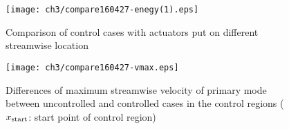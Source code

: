 \begin{figure}
  \centering
  \texttt{[image: ch3/compare160427-enegy(1).eps]}\\
  \caption{Comparison of control cases with actuators put on different streamwise location}\label{f:streamforce}
\end{figure}
\begin{figure}
  \centering
  \texttt{[image: ch3/compare160427-vmax.eps]}\\
  \caption{Differences of maximum streamwise velocity of primary mode between uncontrolled and controlled cases in the control regions ($x_{\rm start}$: start point of control region)}\label{f:streamforce2}
\end{figure}

